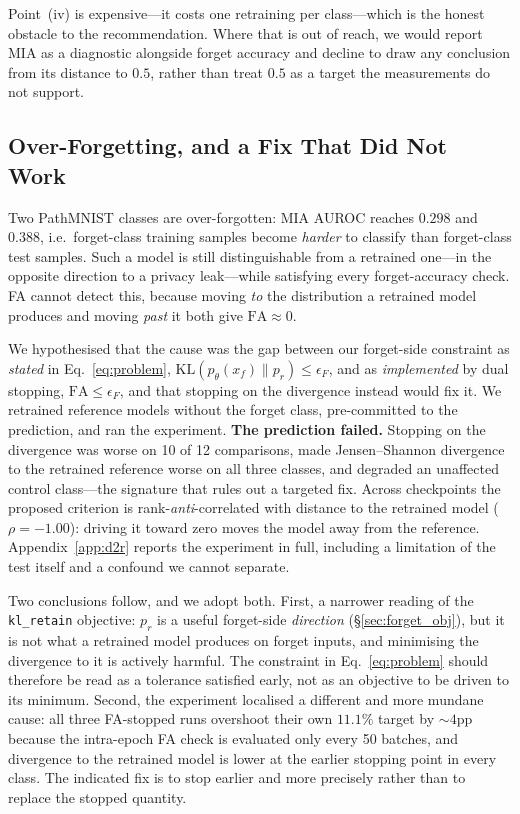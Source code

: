 \documentclass{article}
\newcommand{\klr}{\texttt{kl\_retain}}
\newcommand{\KL}{\mathrm{KL}}
\theoremstyle{remark}
\theoremstyle{plain}
\begin{document}
Point~(iv) is expensive---it costs one retraining per class---which is the
honest obstacle to the recommendation. Where that is out of reach, we would
report MIA as a diagnostic alongside forget accuracy and decline to draw any
conclusion from its distance to $0.5$, rather than treat $0.5$ as a target the
measurements do not support.

\subsection{Over-Forgetting, and a Fix That Did Not Work}\label{sec:overforget}

Two PathMNIST classes are over-forgotten: MIA AUROC reaches $0.298$ and $0.388$,
i.e.\ forget-class training samples become \emph{harder} to classify than
forget-class test samples. Such a model is still distinguishable from a
retrained one---in the opposite direction to a privacy leak---while satisfying
every forget-accuracy check. FA cannot detect this, because moving \emph{to} the
distribution a retrained model produces and moving \emph{past} it both give
$\mathrm{FA}\approx 0$.

We hypothesised that the cause was the gap between our forget-side constraint as
\emph{stated} in Eq.~\ref{eq:problem}, $\KL(p_\theta(x_f)\|p_r)\le\epsilon_F$,
and as \emph{implemented} by dual stopping, $\mathrm{FA}\le\epsilon_F$, and that
stopping on the divergence instead would fix it. We retrained reference models
without the forget class, pre-committed to the prediction, and ran the
experiment. \textbf{The prediction failed.} Stopping on the divergence was worse
on 10 of 12 comparisons, made Jensen--Shannon divergence to the retrained
reference worse on all three classes, and degraded an unaffected control
class---the signature that rules out a targeted fix. Across checkpoints the
proposed criterion is rank-\emph{anti}-correlated with distance to the retrained
model ($\rho=-1.00$): driving it toward zero moves the model away from the
reference. Appendix~\ref{app:d2r} reports the experiment in full, including a
limitation of the test itself and a confound we cannot separate.

Two conclusions follow, and we adopt both. First, a narrower reading of the
\klr{} objective: $p_r$ is a useful forget-side \emph{direction}
(\S\ref{sec:forget_obj}), but it is not what a retrained model produces on
forget inputs, and minimising the divergence to it is actively harmful. The
constraint in Eq.~\ref{eq:problem} should therefore be read as a tolerance
satisfied early, not as an objective to be driven to its minimum. Second, the
experiment localised a different and more mundane cause: all three FA-stopped
runs overshoot their own $11.1\%$ target by ${\sim}4$pp because the intra-epoch
FA check is evaluated only every 50 batches, and divergence to the retrained
model is lower at the earlier stopping point in every class. The indicated fix
is to stop earlier and more precisely rather than to replace the stopped
quantity.
\end{document}
